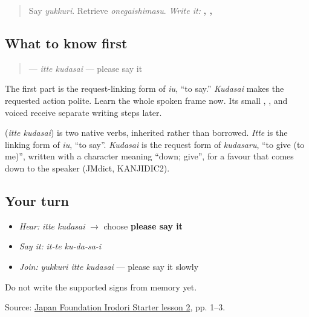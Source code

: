 \begin{quote}
Say \emph{yukkuri}. Retrieve \emph{onegaishimasu}. \emph{Write it:} \textbf{, , }
\end{quote}

\subsection*{What to know first}
\begin{quote}
\textbf{} — \emph{itte kudasai} — please say it
\end{quote}

The first part is the request-linking form of \emph{iu}, “to say.” \emph{Kudasai} makes the requested action polite. Learn the whole spoken frame now. Its small \textbf{}, \textbf{}, and voiced \textbf{} receive separate writing steps later.

\begin{cousinweb}
\textbf{} (\emph{itte kudasai}) is two native verbs, inherited rather than borrowed. \emph{Itte} is the linking form of \emph{iu}, \textquotedblleft{}to say\textquotedblright{}. \emph{Kudasai} is the request form of \emph{kudasaru}, \textquotedblleft{}to give (to me)\textquotedblright{}, written with a character meaning \textquotedblleft{}down; give\textquotedblright{}, for a favour that comes down to the speaker (JMdict, KANJIDIC2).
\end{cousinweb}

\subsection*{Your turn}
\begin{itemize}
\raggedright
  \item \emph{Hear:} \emph{itte kudasai} $\to$ choose \textbf{please say it}
  \item \emph{Say it:} \emph{it-te ku-da-sa-i}
  \item \emph{Join:} \emph{yukkuri itte kudasai} — please say it slowly
\end{itemize}

\begin{tcolorbox}[breakable,colback=teal!4,colframe=teal!35!black,title={Before you move on}]
Do not write the supported signs from memory yet.

Source: \href{https://www.irodori.jpf.go.jp/assets/data/starter/pdf/X\_L02.pdf}{Japan Foundation Irodori Starter lesson 2}, pp. 1–3.
\end{tcolorbox}
